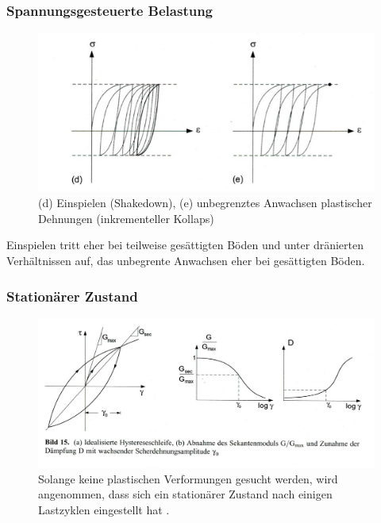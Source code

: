 \documentclass[hyperref={pdfpagemode=FullScreen, colorlinks=false}]{beamer}
\begin{document}
\begin{frame}
\frametitle{Spannungsgesteuerte Belastung}
\begin{figure}
\centering
\includegraphics[width=0.75\linewidth]{fig_img/bild14de.jpg}
\caption*{(d) Einspielen (Shakedown), (e) unbegrenztes Anwachsen plastischer Dehnungen (inkrementeller Kollaps) \cite{Vrettos2017}} 
\end{figure}
Einspielen tritt eher bei teilweise gesättigten Böden und unter dränierten Verhältnissen auf, das unbegrente Anwachsen eher bei gesättigten Böden.
\end{frame}

\begin{frame}
\frametitle{Stationärer Zustand}
\begin{figure}
\centering
\includegraphics[width=\linewidth]{fig_img/bild15.jpg}
\caption*{Solange keine plastischen Verformungen gesucht werden,
wird angenommen, dass sich ein stationärer Zustand nach einigen Lastzyklen eingestellt hat \cite{Vrettos2017}.} 
\end{figure}
\end{frame}
\end{document}
